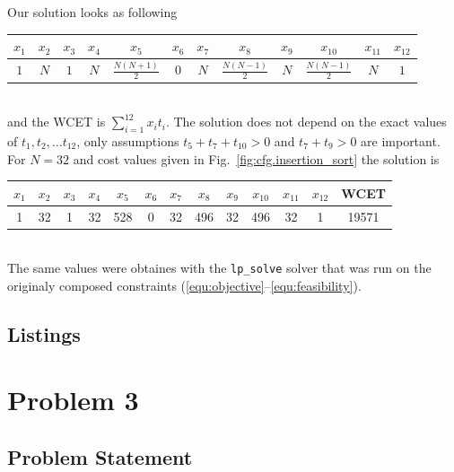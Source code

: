\documentclass[12pt,a4paper,titlepage,oneside]{article}
\begin{document}
\begin{itemize}
Our solution looks as following\\
\begin{tabular}{c|c|c|c|c|c|c|c|c|c|c|c}
\hline
$x_1$ & $x_2$ & $x_3$ & $x_4$ & $x_5$ & $x_6$ & $x_7$ & $x_8$ & $x_9$ & $x_{10}$ & $x_{11}$ & $x_{12}$ \\
\hline
$1$ & $N$ & $1$ & $N$ & $\frac{N(N+1)}2$ & $0$ & $N$ & $\frac{N(N-1)}2$ & $N$ & $\frac{N(N-1)}2$ & $N$ & $1$ \\
\hline
\end{tabular}\\
and the WCET is $\sum_{i=1}^{12} x_i t_i$.
The solution does not depend on the exact values of $t_1, t_2, \ldots t_{12}$, only assumptions $t_5 + t_7 + t_{10} > 0$ and $t_7+t_9 > 0$ are important.
For $N=32$ and cost values given in Fig.~\ref{fig:cfg.insertion_sort} the solution is\\
\begin{tabular}{c|c|c|c|c|c|c|c|c|c|c|c|c}
\hline
$x_1$ & $x_2$ & $x_3$ & $x_4$ & $x_5$ & $x_6$ & $x_7$ & $x_8$ & $x_9$ & $x_{10}$ & $x_{11}$ & $x_{12}$ & WCET\\
\hline
1 & 32 & 1 & 32 & 528 & 0 & 32 & 496 & 32 & 496 & 32 & 1  & 19571\\
\hline
\end{tabular}\\
The same values were obtaines with the \texttt{lp\_solve} solver that was run on the originaly composed constraints (\ref{equ:objective}--\ref{equ:feasibility}).



\end{itemize}





\subsection{Listings}

\newpage
\section{Problem 3}

\subsection{Problem Statement}

\end{document}
